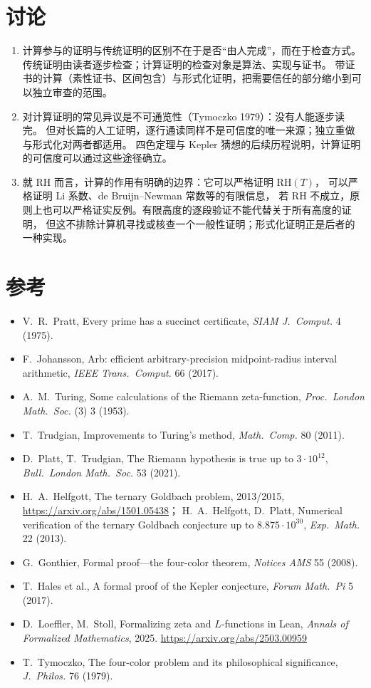 \documentclass[11pt]{article}
\begin{document}
\section{讨论}
\begin{enumerate}
 \item 计算参与的证明与传统证明的区别不在于是否“由人完成”，而在于检查方式。
 传统证明由读者逐步检查；计算证明的检查对象是算法、实现与证书。
 带证书的计算（素性证书、区间包含）与形式化证明，把需要信任的部分缩小到可以独立审查的范围。
 \item 对计算证明的常见异议是不可通览性（Tymoczko 1979）：没有人能逐步读完。
 但对长篇的人工证明，逐行通读同样不是可信度的唯一来源；独立重做与形式化对两者都适用。
 四色定理与 Kepler 猜想的后续历程说明，计算证明的可信度可以通过这些途径确立。
 \item 就 RH 而言，计算的作用有明确的边界：它可以严格证明 $\mathrm{RH}(T)$，
 可以严格证明 Li 系数、de Bruijn--Newman 常数等的有限信息，
 若 RH 不成立，原则上也可以严格证实反例。有限高度的逐段验证不能代替关于所有高度的证明，
 但这不排除计算机寻找或核查一个一般性证明；形式化证明正是后者的一种实现。
\end{enumerate}

\section*{参考}
\begingroup
\small
\begin{itemize}[itemsep=2pt,topsep=3pt,parsep=0pt]
 \item V.\ R.\ Pratt, Every prime has a succinct certificate, \emph{SIAM J.\ Comput.} 4 (1975).
 \item F.\ Johansson, Arb: efficient arbitrary-precision midpoint-radius interval arithmetic, \emph{IEEE Trans.\ Comput.} 66 (2017).
 \item A.\ M.\ Turing, Some calculations of the Riemann zeta-function, \emph{Proc.\ London Math.\ Soc.} (3) 3 (1953).
 \item T.\ Trudgian, Improvements to Turing's method, \emph{Math.\ Comp.} 80 (2011).
 \item D.\ Platt, T.\ Trudgian, The Riemann hypothesis is true up to $3\cdot10^{12}$, \emph{Bull.\ London Math.\ Soc.} 53 (2021).
 \item H.\ A.\ Helfgott, The ternary Goldbach problem, 2013/2015, \url{https://arxiv.org/abs/1501.05438}；
 H.\ A.\ Helfgott, D.\ Platt, Numerical verification of the ternary Goldbach conjecture up to $8.875\cdot10^{30}$, \emph{Exp.\ Math.} 22 (2013).
 \item G.\ Gonthier, Formal proof---the four-color theorem, \emph{Notices AMS} 55 (2008).
 \item T.\ Hales et al., A formal proof of the Kepler conjecture, \emph{Forum Math.\ Pi} 5 (2017).
 \item D.\ Loeffler, M.\ Stoll, Formalizing zeta and $L$-functions in Lean, \emph{Annals of Formalized Mathematics}, 2025. \url{https://arxiv.org/abs/2503.00959}
 \item T.\ Tymoczko, The four-color problem and its philosophical significance, \emph{J.\ Philos.} 76 (1979).
\end{itemize}
\endgroup
\end{document}
